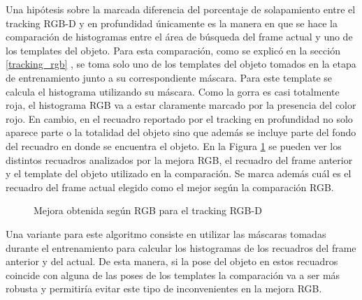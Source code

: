 Una hipótesis sobre la marcada diferencia del porcentaje de solapamiento entre el tracking RGB-D y en profundidad únicamente es la manera en que se hace la comparación de histogramas entre el área de búsqueda del frame actual y uno de los templates del objeto.  Para esta comparación, como se explicó en la sección \ref{tracking_rgb} , se toma solo uno de los templates del objeto tomados en la etapa de entrenamiento junto a su correspondiente máscara. Para este template se calcula el histograma utilizando su máscara. Como la gorra es casi totalmente roja, el histograma RGB va a estar claramente marcado por la presencia del color rojo. En cambio, en el recuadro reportado por el tracking en profundidad no solo aparece parte o la totalidad del objeto sino que además se incluye parte del fondo del recuadro en donde se encuentra el objeto. En la Figura \ref{mejora_rgb_en_tracking_rgbd} se pueden ver los distintos recuadros analizados por la mejora RGB, el recuadro del frame anterior y el template del objeto utilizado en la comparación. Se marca además cuál es el recuadro del frame actual elegido como el mejor según la comparación RGB. 

\begin{figure}
	\caption{Mejora obtenida según RGB para el tracking RGB-D}
	\label{mejora_rgb_en_tracking_rgbd}
\end{figure}

Una variante para este algoritmo consiste en utilizar las máscaras tomadas durante el entrenamiento para calcular los histogramas de los recuadros del frame anterior y del actual. De esta manera, si la pose del objeto en estos recuadros coincide con alguna de las poses de los templates la comparación va a ser más robusta y permitiría evitar este tipo de inconvenientes en la mejora RGB.

